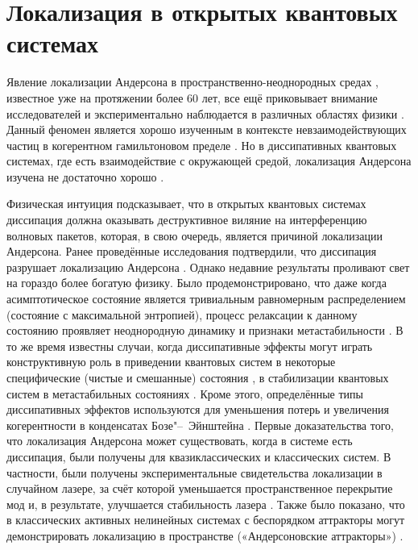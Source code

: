 \chapter{Локализация в открытых квантовых системах}\label{ch:ch1}
Явление локализации Андерсона в пространственно-неоднородных средах \autocite{Anderson1958}, известное уже на протяжении более 60 лет, все ещё приковывает внимание исследователей \autocite{Kramer1993, Evers2008, Esposito2012} и экспериментально наблюдается в различных областях физики \cite{Segev2013, Billy2008, Roati2008, Kondov2011, Jendrzejewski2012}.
Данный феномен является хорошо изученным в контексте невзаимодействующих частиц в когерентном гамильтоновом пределе \autocite{Segev2013, Billy2008, Roati2008, Yedjour2010, Kondov2011, Jendrzejewski2012}.
Но в диссипативных квантовых системах, где есть взаимодействие с окружающей средой, локализация Андерсона изучена не достаточно хорошо \autocite{Breuer2007}.

Физическая интуиция подсказывает, что в открытых квантовых системах диссипация должна оказывать деструктивное виляние на интерференцию волновых пакетов, которая, в свою очередь, является причиной локализации Андерсона.
Ранее проведённые исследования подтвердили, что диссипация разрушает локализацию Андерсона \cite{Gurvitz2000, Nowak2012, Flores1999}. 
Однако недавние результаты проливают свет на гораздо более богатую физику. 
Было продемонстрировано, что даже когда асимптотическое состояние является тривиальным равномерным распределением (состояние с максимальной энтропией), процесс релаксации к данному состоянию проявляет неоднородную динамику и признаки метастабильности \cite{Genway2014}.
В то же время известны случаи, когда диссипативные эффекты могут играть конструктивную роль в приведении квантовых систем в некоторые специфические (чистые и смешанные) состояния \cite{Diehl2008, Kraus2008, Verstraete2009}, в стабилизации квантовых систем в метастабильных состояниях \cite{Valenti2015, Spagnolo2015, Spagnolo2016, Magazz2015, Magazz2016}.
Кроме этого, определённые типы диссипативных эффектов используются для уменьшения потерь и увеличения когерентности в конденсатах Бозе"--~Эйнштейна \cite{Syassen2008, Witthaut2008, Witthaut2011, Kordas2013}.
Первые доказательства того, что локализация Андерсона может существовать, когда в системе есть диссипация, были получены для квазиклассических и классических систем. 
В частности, были получены экспериментальные свидетельства локализации в случайном лазере, за счёт которой уменьшается пространственное перекрытие мод и, в результате, улучшается стабильность лазера \autocite{Stano2012, Liu2014}.
Также было показано, что в классических активных нелинейных системах с беспорядком аттракторы могут демонстрировать локализацию в пространстве («Андерсоновские аттракторы») \cite{Laptyeva2015_1, Laptyeva2015_2}. 

